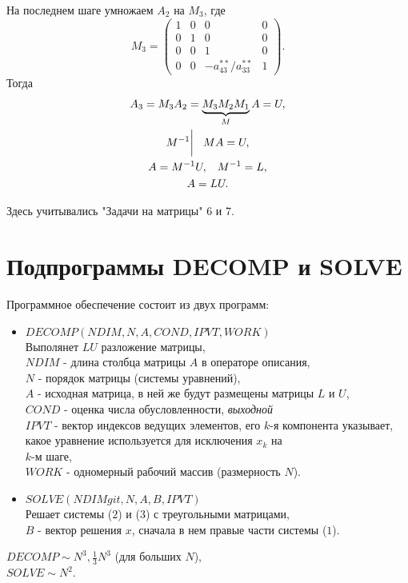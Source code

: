 \documentclass[a4paper,11pt]{article}
\begin{document}
На последнем шаге умножаем $A_2$ на $M_3$, где
\begin{equation*}
  M_3 =
  \begin{pmatrix}
    1 & 0 & 0 & 0 \\
    0 & 1 & 0 & 0 \\
    0 & 0 & 1 & 0 \\
    0 & 0 & -a_{43}^{**}/a_{33}^{**} & 1
  \end{pmatrix}.
\end{equation*}
Тогда
\begin{gather*}
  A_3 = M_3A_2 = \underbrace{M_3M_2M_1}_{M}A = U, \\
  M^{-1} \bigg| \hspace{3mm} MA=U, \\
  A = M^{-1}U, \hspace{3mm} M^{-1} = L, \\
  A = LU.
\end{gather*}
\begin{flushright}
  \footnotesize Здесь учитывались "Задачи на матрицы" 6 и 7.
\end{flushright}

\section{Подпрограммы DECOMP и SOLVE}
Программное обеспечение состоит из двух программ:
\begin{itemize}
  \item $DECOMP(NDIM, N, A, COND, IPVT, WORK)$ \\
    Выполянет $LU$ разложение матрицы, \vspace{2mm} \\
    $NDIM$ - длина столбца матрицы $A$ в операторе описания, \\
    $N$ - порядок матрицы (системы уравнений), \\
    $A$ - исходная матрица, в ней же будут размещены матрицы $L$ и $U$, \\
    $COND$ - оценка числа обусловленности, \textit{выходной}\\
    $IPVT$ - вектор индексов ведущих элементов, его $k$-я компонента указывает, какое уравнение используется для исключения $x_k$ на \\ $k$-м шаге, \\
    $WORK$ - одномерный рабочий массив (размерность $N$).
  \item $SOLVE(NDIMgit , N, A, B, IPVT)$ \\
    Решает системы ($2$) и ($3$) с треугольными матрицами, \\
    $B$ - вектор решения $x$, сначала в нем правые части системы ($1$).
\end{itemize}
\begin{flushright}
  \small
  $DECOMP \sim N^3, \frac{1}{3}N^3$ (для больших $N$), \\
  $SOLVE \sim N^2$.
\end{flushright}
\end{document}

